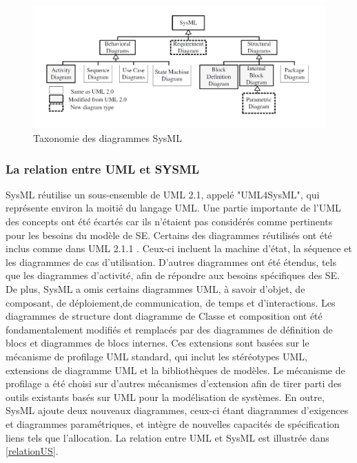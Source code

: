 \documentclass[french]{spimufcphdthesis}
\begin{document}
\begin{figure}[H]
\begin{center}
\includegraphics[scale=0.45]{figures/SysML.png}
\caption{Taxonomie des diagrammes SysML}
\label{SysML_diag}
\end{center}
\end{figure}

\subsubsection{La relation entre UML et SYSML}

 SysML réutilise un sous-ensemble de UML 2.1, appelé "UML4SysML", qui représente environ la moitié du langage UML. Une partie importante de l'UML des concepts ont été écartés car ils n'étaient pas considérés comme pertinents pour les besoins du modèle de SE.
Certains des diagrammes réutilisés ont été inclus comme dans UML 2.1.1 .
Ceux-ci incluent la machine d'état, la séquence et les diagrammes de cas d'utilisation.
D'autres diagrammes ont été étendus, tels que les diagrammes d'activité, afin de répondre aux besoins spécifiques des SE.
De plus, SysML a omis certains diagrammes UML, à savoir d'objet, de composant, de déploiement,de communication, de temps et d'interactions.
Les diagrammes de structure dont diagramme de Classe et composition ont été fondamentalement modifiés et remplacés par des diagrammes de définition de blocs et diagrammes de blocs internes. Ces extensions sont basées sur le mécanisme de profilage UML standard, qui inclut les stéréotypes UML, extensions de diagramme UML et la bibliothèques de modèles. Le mécanisme de profilage a été choisi sur d'autres mécanismes d'extension afin de tirer parti des outils existants basés sur UML pour la modélisation de systèmes. En outre, SysML ajoute deux nouveaux diagrammes, ceux-ci étant diagrammes d'exigences et diagrammes paramétriques, et intègre de nouvelles capacités de spécification liens tels que l'allocation. La relation entre UML et SysML est illustrée dans \ref{relationUS}.
\end{document}
